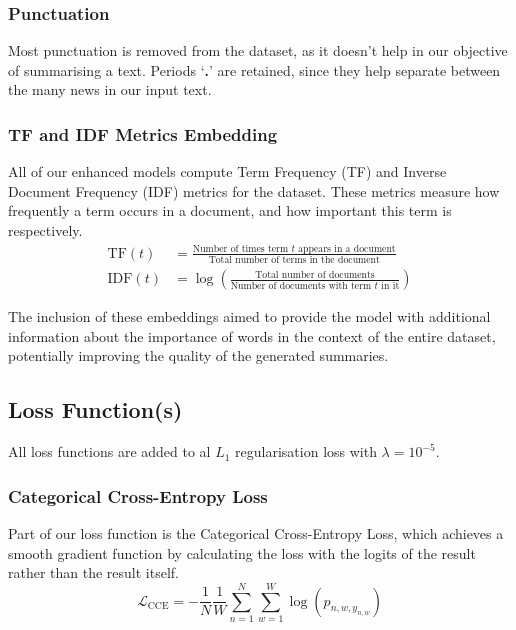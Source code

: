 \subsubsection{Punctuation}
Most punctuation is removed from the dataset, as it doesn't help in our objective of summarising a text.
Periods \textsf{`\textbf{.}'} are retained, since they help separate between the many news in our input text.

\subsubsection{TF and IDF Metrics Embedding}

All of our enhanced models compute Term Frequency (TF) and Inverse Document Frequency (IDF) metrics for the dataset\cite{nallapati2016abstractive}.
These metrics measure how frequently a term occurs in a document, and how important this term is respectively.
\begin{align}
	\text{TF}(t) &= \frac{\text{Number of times term $t$ appears in a document}}{\text{Total number of terms in the document}} \\[1ex]
	\text{IDF}(t) &= \log \left( \frac{\text{Total number of documents}}{\text{Number of documents with term $t$ in it}} \right)
\end{align}

The inclusion of these embeddings aimed to provide the model with additional information about the importance of words in the context of the entire dataset, potentially improving the quality of the generated summaries.

\subsection{Loss Function(s)}

All loss functions are added to al $L_1$ regularisation loss with $\lambda = 10^{-5}$.

\subsubsection{Categorical Cross-Entropy Loss}

Part of our loss function is the Categorical Cross-Entropy Loss\cite{cross_entropy_loss}, which achieves a smooth gradient function by calculating the loss with the logits of the result rather than the result itself.
\begin{equation}
	\mathcal{L}_\text{CCE} = - \frac{1}{N} \frac{1}{W} \sum_{n=1}^{N} \sum^W_{w = 1} \log(p_{n,w,y_{n,w}})
\end{equation}

